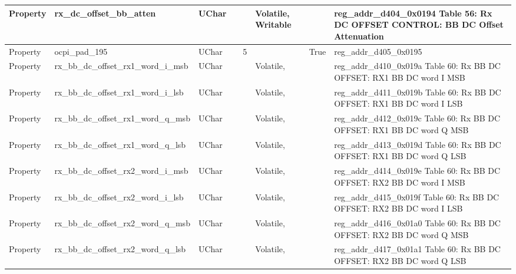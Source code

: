 \documentclass{article}
\begin{document}
\begin{scriptsize}
\begin{longtable}{|p{2cm}|p{5cm}|p{1cm}|p{2cm}|p{2cm}|p{1.75cm}|p{1.5cm}|p{5.1cm}|}
  \hline
  Property & rx\_dc\_offset\_bb\_atten                                & UChar &                  &                  & Volatile,  Writable &         & reg\_addr\_d404\_0x0194 Table 56: Rx DC OFFSET CONTROL: BB DC Offset Attenuation \\
  \hline
  Property & ocpi\_pad\_195                                           & UChar &                  & 5                &                     & True    & reg\_addr\_d405\_0x0195 \\
  \hline
  Property & rx\_bb\_dc\_offset\_rx1\_word\_i\_msb                    & UChar &                  &                  & Volatile,           &         & reg\_addr\_d410\_0x019a Table 60: Rx BB DC OFFSET: RX1 BB DC word I MSB \\
  \hline
  Property & rx\_bb\_dc\_offset\_rx1\_word\_i\_lsb                    & UChar &                  &                  & Volatile,           &         & reg\_addr\_d411\_0x019b Table 60: Rx BB DC OFFSET: RX1 BB DC word I LSB \\
  \hline
  Property & rx\_bb\_dc\_offset\_rx1\_word\_q\_msb                    & UChar &                  &                  & Volatile,           &         & reg\_addr\_d412\_0x019c Table 60: Rx BB DC OFFSET: RX1 BB DC word Q MSB \\
  \hline
  Property & rx\_bb\_dc\_offset\_rx1\_word\_q\_lsb                    & UChar &                  &                  & Volatile,           &         & reg\_addr\_d413\_0x019d Table 60: Rx BB DC OFFSET: RX1 BB DC word Q LSB \\
  \hline
  Property & rx\_bb\_dc\_offset\_rx2\_word\_i\_msb                    & UChar &                  &                  & Volatile,           &         & reg\_addr\_d414\_0x019e Table 60: Rx BB DC OFFSET: RX2 BB DC word I MSB \\
  \hline
  Property & rx\_bb\_dc\_offset\_rx2\_word\_i\_lsb                    & UChar &                  &                  & Volatile,           &         & reg\_addr\_d415\_0x019f Table 60: Rx BB DC OFFSET: RX2 BB DC word I LSB \\
  \hline
  Property & rx\_bb\_dc\_offset\_rx2\_word\_q\_msb                    & UChar &                  &                  & Volatile,           &         & reg\_addr\_d416\_0x01a0 Table 60: Rx BB DC OFFSET: RX2 BB DC word Q MSB \\
  \hline
  Property & rx\_bb\_dc\_offset\_rx2\_word\_q\_lsb                    & UChar &                  &                  & Volatile,           &         & reg\_addr\_d417\_0x01a1 Table 60: Rx BB DC OFFSET: RX2 BB DC word Q LSB \\

\end{longtable}
\end{scriptsize}
\end{document}
